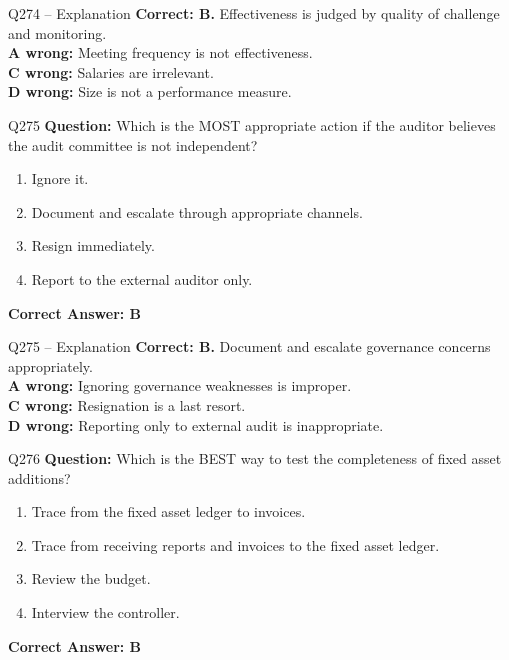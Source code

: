 \documentclass[aspectratio=169,10pt]{beamer}
\begin{document}
	\begin{frame}[t]{Q274 -- Explanation}
		\small
		\textbf{Correct: B.} Effectiveness is judged by quality of challenge and monitoring. \\[4pt]
		\textbf{A wrong:} Meeting frequency is not effectiveness. \\[2pt]
		\textbf{C wrong:} Salaries are irrelevant. \\[2pt]
		\textbf{D wrong:} Size is not a performance measure.
	\end{frame}
	
	\begin{frame}[t]{Q275}
		\small
		\textbf{Question:} Which is the MOST appropriate action if the auditor believes the audit committee is not independent?
		\begin{enumerate}[label=\Alph*.,itemsep=1pt,topsep=2pt]
			\item Ignore it.
			\item Document and escalate through appropriate channels.
			\item Resign immediately.
			\item Report to the external auditor only.
		\end{enumerate}
		\vspace{4pt}
		\textbf{Correct Answer: B}
	\end{frame}
	
	\begin{frame}[t]{Q275 -- Explanation}
		\small
		\textbf{Correct: B.} Document and escalate governance concerns appropriately. \\[4pt]
		\textbf{A wrong:} Ignoring governance weaknesses is improper. \\[2pt]
		\textbf{C wrong:} Resignation is a last resort. \\[2pt]
		\textbf{D wrong:} Reporting only to external audit is inappropriate.
	\end{frame}
	
	\begin{frame}[t]{Q276}
		\small
		\textbf{Question:} Which is the BEST way to test the completeness of fixed asset additions?
		\begin{enumerate}[label=\Alph*.,itemsep=1pt,topsep=2pt]
			\item Trace from the fixed asset ledger to invoices.
			\item Trace from receiving reports and invoices to the fixed asset ledger.
			\item Review the budget.
			\item Interview the controller.
		\end{enumerate}
		\vspace{4pt}
		\textbf{Correct Answer: B}
	\end{frame}
	
\end{document}
